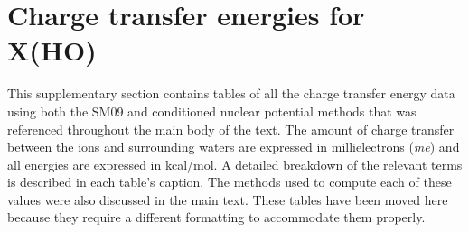 \chapter{Charge transfer energies for X\sur{\pm}(HO)~}
\label{chap:a3}


This supplementary section contains tables of all the charge transfer energy data using both the SM09 and conditioned nuclear potential methods that was referenced 
throughout the main body of the text. The amount of charge transfer between the ions and surrounding waters are expressed in millielectrons (\emph{me}) and all 
energies are expressed in kcal/mol. A detailed breakdown of the relevant terms is described in each table's caption. The methods used to compute each of these 
values were also discussed in the main text. These tables have been moved here because they require a different formatting to accommodate them properly.


